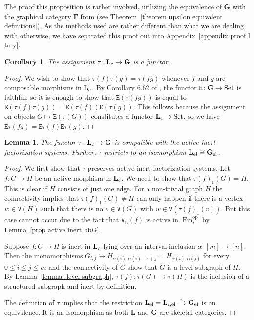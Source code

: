 \documentclass{amsart}
\numberwithin{theorem}{subsection}
\newtheorem{corollary}[theorem]{Corollary}
\newtheorem{lemma}[theorem]{Lemma}
\theoremstyle{definition}
\providecommand{\op}{\mathrm{op}}
\providecommand{\xel}{\mathrm{el}}
\newcommand{\finset}{\operatorname{Fin}}
\newcommand{\pfinset}{\finset_*}
\newcommand{\isoto}{\xrightarrow{\sim}}
\newcommand{\name}[1]{\ensuremath{\text{\textup{#1}}}}
\newcommand{\levelg}{\mathbf{L}}
\newcommand{\levelgconn}{\levelg_{\name{c}}}
\newcommand{\levelel}{\levelg_{\name{el}}}
\newcommand{\bbY}{\mathbf{G}}
\newcommand{\hryGamma}{\mathbf{\Gamma}}
\newcommand{\Set}{\name{Set}}
\newcommand{\edge}{\mathtt{E}}
\newcommand{\vertex}{\mathtt{V}}
\begin{document}
The proof this proposition is rather involved, utilizing the equivalence of $\bbY$ with the graphical category $\hryGamma$ from \cite{hrybook} (see Theorem~\ref{theorem upsilon equivalent definitions}).
As the methods used are rather different than what we are dealing with otherwise, we have separated this proof out into Appendix~\ref{appendix proof l to y}.

\begin{corollary}
\label{corollary functor l to y}
The assignment $\tau \colon \levelgconn \to \bbY$ is a functor.
\end{corollary}
\begin{proof}
We wish to show that $\tau(f)\tau(g) = \tau(fg)$ whenever $f$ and $g$ are composable morphisms in $\levelgconn$.
By Corollary 6.62 of \cite{hrybook}, the functor $\edge \colon \bbY \to \Set$ is faithful, so it is enough to show that $\edge(\tau(fg))$ is equal to $\edge(\tau(f)\tau(g)) = \edge(\tau(f)) \edge(\tau(g))$.
This follows because the assignment on objects $G \mapsto \edge(\tau(G))$ constitutes a functor $\levelgconn \to \Set$, so we have $\edge\tau(fg) = \edge\tau(f) \edge\tau(g)$.
\end{proof}

\begin{lemma}\label{lem factorization int el}
The functor $\tau\colon \levelgconn \to \bbY$ is compatible with the active-inert factorization systems.
Further, $\tau$ restricts to an isomorphism $\levelel \cong \bbY_\xel$.
\end{lemma}
\begin{proof}
	We first show that $\tau$ preserves active-inert factorization systems.
	Let $f\colon G\to H$ be an active morphism in $\levelgconn$. We need to show that $\tau(f)_1(G)=H$. This is clear if $H$ consists of just one edge. For a non-trivial graph $H$ the connectivity implies that $\tau(f)_1(G)\neq H$ can only happen if there is a vertex $w\in \vertex(H)$ such that there is no $v\in \vertex(G)$ with $w\in \vertex(\tau(f)_1(v))$. But this case cannot occur due to the fact that $\vertex_{\levelg}(f)$ is active in $\pfinset^\op$ by Lemma~\ref{prop active inert bbG}.
	
	Suppose $f\colon G\to H$ is inert in $\levelgconn$ lying over an interval inclusion $\alpha\colon [m]\to [n]$.
	Then the monomorphisms $G_{i,j}\hookrightarrow H_{\alpha(i), \alpha(i)-i+j}= H_{\alpha(i), \alpha(j)}$ for every $0\leq i\leq j\leq m$ and the connectivity of $G$ show that $G$ is a level subgraph of $H$. By Lemma~\ref{lemma: level subgraph}, $\tau(f)\colon \tau(G)\to \tau(H)$ is the inclusion of a structured subgraph and inert by definition.
	
	The definition of $\tau$ implies that the restriction $\levelel = \levelg_{\name{c,el}} \isoto \bbY_\xel$ is an equivalence.
It is an isomorphism as both $\levelg$ and $\bbY$ are skeletal categories.
\end{proof}
\end{document}
